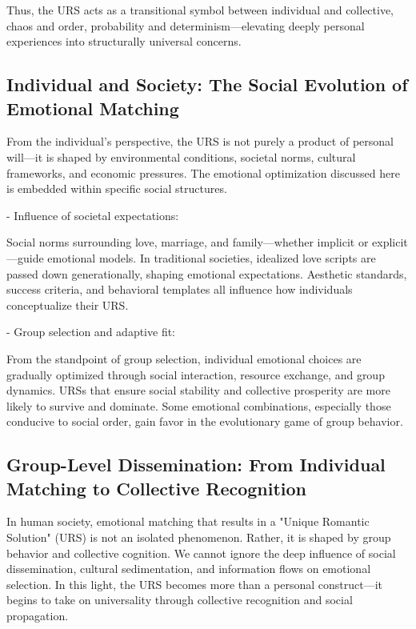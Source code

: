 \documentclass{article}
\begin{document}
Thus, the URS acts as a transitional symbol between individual and collective, chaos and order, probability and determinism—elevating deeply personal experiences into structurally universal concerns.

\subsection{Individual and Society: The Social Evolution of Emotional Matching}

From the individual’s perspective, the URS is not purely a product of personal will—it is shaped by environmental conditions, societal norms, cultural frameworks, and economic pressures. The emotional optimization discussed here is embedded within specific social structures.

- Influence of societal expectations: 

Social norms surrounding love, marriage, and family—whether implicit or explicit—guide emotional models. In traditional societies, idealized love scripts are passed down generationally, shaping emotional expectations. Aesthetic standards, success criteria, and behavioral templates all influence how individuals conceptualize their URS.

- Group selection and adaptive fit: 

From the standpoint of group selection, individual emotional choices are gradually optimized through social interaction, resource exchange, and group dynamics. URSs that ensure social stability and collective prosperity are more likely to survive and dominate. Some emotional combinations, especially those conducive to social order, gain favor in the evolutionary game of group behavior.

\subsection{Group-Level Dissemination: From Individual Matching to Collective Recognition}

In human society, emotional matching that results in a "Unique Romantic Solution" (URS) is not an isolated phenomenon. Rather, it is shaped by group behavior and collective cognition. We cannot ignore the deep influence of social dissemination, cultural sedimentation, and information flows on emotional selection. In this light, the URS becomes more than a personal construct—it begins to take on universality through collective recognition and social propagation.
\end{document}

